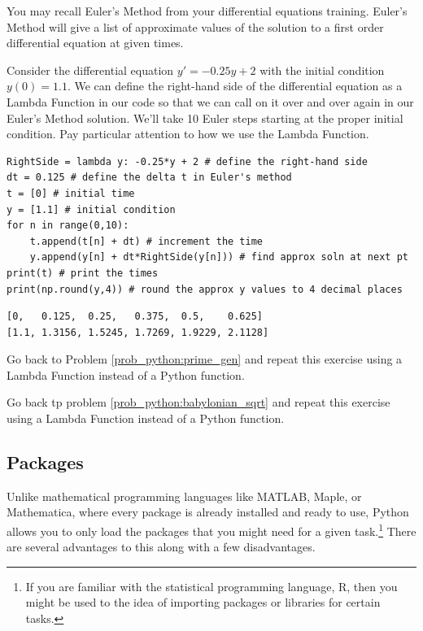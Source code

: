 \begin{example}
    You may recall Euler's Method from your differential equations training.  Euler's
    Method will give a list of approximate values of the solution to a first order
    differential equation at given times. 

    Consider the differential equation $y' = -0.25y + 2$ with the initial condition $y(0)
    = 1.1$.  We can define the right-hand side of the differential equation as a Lambda
    Function in our code so that we can call on it over and over again in our Euler's
    Method solution.  We'll take 10 Euler steps starting at the proper initial condition.
    Pay particular attention to how we use the Lambda Function.

\bcode
\begin{lstlisting}
RightSide = lambda y: -0.25*y + 2 # define the right-hand side
dt = 0.125 # define the delta t in Euler's method
t = [0] # initial time
y = [1.1] # initial condition
for n in range(0,10):
    t.append(t[n] + dt) # increment the time
    y.append(y[n] + dt*RightSide(y[n])) # find approx soln at next pt
print(t) # print the times
print(np.round(y,4)) # round the approx y values to 4 decimal places
\end{lstlisting}
\boutput
\begin{lstlisting}
[0,   0.125,  0.25,   0.375,  0.5,    0.625]
[1.1, 1.3156, 1.5245, 1.7269, 1.9229, 2.1128]
\end{lstlisting}
\end{example}


\begin{problem}
    Go back to Problem \ref{prob_python:prime_gen} and repeat this exercise using a Lambda Function
    instead of a Python function.
\end{problem}

\begin{problem}
    Go back tp problem \ref{prob_python:babylonian_sqrt} and repeat this exercise using a Lambda Function
    instead of a Python function.
\end{problem}


\subsection{Packages}
Unlike mathematical programming languages like MATLAB, Maple, or Mathematica, where every
package is already installed and ready to use, Python allows you to only load the packages
that you might need for a given task.\footnote{If you are familiar with the statistical
    programming language, R, then you might be used to the idea of importing packages or
libraries for certain tasks.}  There are several advantages to this along with a
few disadvantages.

